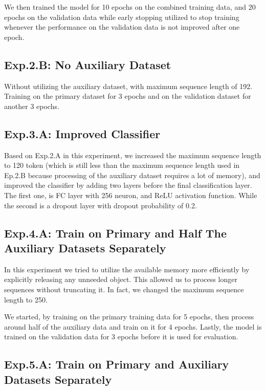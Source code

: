 \documentclass[10pt,twocolumn,letterpaper]{article}
\begin{document}
We then trained the model for 10 epochs on the combined training data, and 20 epochs on the validation data while early stopping utilized to stop training whenever the performance on the validation data is not improved after one epoch. 

\subsection{Exp.2.B: No Auxiliary Dataset}

Without utilizing the auxiliary dataset, with maximum sequence length of 192. Training on the primary dataset for 3
epochs and on the validation dataset for another 3 epochs.

\subsection{Exp.3.A: Improved Classifier}

Based on Exp.2.A in this experiment, we increased the maximum sequence length to 120 token (which is still less than the maximum sequence length used in Ep.2.B because processing of the auxiliary dataset requires a lot of memory), and improved the classifier by adding two layers before the final classification layer. The first one, is FC layer with 256 neuron, and ReLU activation function. While the second is a dropout layer with dropout probability of 0.2.

\subsection{Exp.4.A: Train on Primary and Half The Auxiliary Datasets Separately}

In this experiment we tried to utilize the available memory more efficiently by explicitly releasing any unneeded object. This allowed us to process longer sequences without truncating it. In fact, we changed the maximum sequence length to 250. 

We started, by training on the primary training data for 5 epochs, then process around half of the auxiliary data and train on it for 4 epochs. Lastly, the model is trained on the validation data for 3 epochs before it is used for evaluation. 

\subsection{Exp.5.A: Train on Primary and Auxiliary Datasets Separately} 
\end{document}
